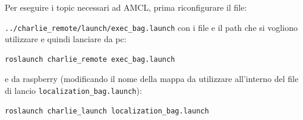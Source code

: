 Per eseguire i topic necessari ad AMCL, prima riconfigurare il file:

\verb|../charlie_remote/launch/exec_bag.launch| con i file e il path che si vogliono utilizzare e quindi lanciare da pc:
\begin{lstlisting}[style=bashPC]
	roslaunch charlie_remote exec_bag.launch
\end{lstlisting}
e da raspberry (modificando il nome della mappa da utilizzare all'interno del file di lancio \verb|localization_bag.launch|):
\begin{lstlisting}[style=bash]
	roslaunch charlie_launch localization_bag.launch
\end{lstlisting}



\newpage



